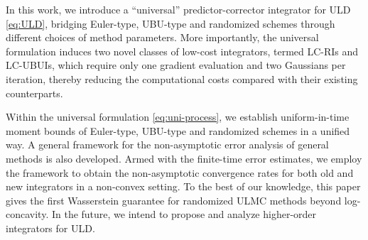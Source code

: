 \documentclass[12pt]{article}
\newenvironment{redtext}
  {\color{black}\ignorespaces}
  {\ignorespacesafterend}
\numberwithin{equation}{section}
\begin{document}
\begin{redtext}
In this work, we introduce a ``universal'' predictor-corrector integrator for ULD \eqref{eq:ULD}, bridging Euler-type, UBU-type and randomized schemes through different choices of method parameters. More importantly, the universal formulation induces two novel classes of low-cost integrators, termed LC-RIs and LC-UBUIs, which require only one gradient evaluation and two Gaussians per iteration, thereby reducing the computational costs compared with their existing counterparts.

Within the universal formulation \eqref{eq:uni-process}, we establish uniform-in-time moment bounds of Euler-type, UBU-type and randomized schemes in a unified way. A general framework for the non-asymptotic error analysis of general methods is also developed. Armed with the finite-time error estimates, we employ the framework to obtain the non-asymptotic convergence rates for both old and new integrators in a non-convex setting. To the best of our knowledge, this paper gives the first Wasserstein guarantee for randomized ULMC methods beyond log-concavity.
In the future, we intend to propose and analyze higher-order integrators for ULD.
\end{redtext}





%

%


\end{document}
